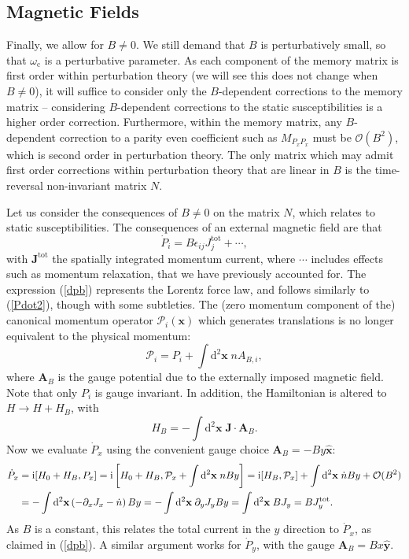 \documentclass[10pt, oneside]{book}
\begin{document}
\begin{doublespace}
\subsection{Magnetic Fields}
Finally, we allow for $B\ne 0$.   We still demand that $B$ is perturbatively small, so that $\omega_{\mathrm{c}}$ is a perturbative parameter.    As each component of the memory matrix is first order within perturbation theory (we will see this does not change when $B\ne 0$), it will suffice to consider only the $B$-dependent corrections to the memory matrix -- considering $B$-dependent corrections to the static susceptibilities is a higher order correction.       Furthermore, within the memory matrix, any $B$-dependent correction to a parity even coefficient such as $M_{P_xP_x}$ must be $\mathcal{O}(B^2)$, which is second order in perturbation theory.    The only matrix which may admit first order corrections within perturbation theory that are linear in $B$ is the time-reversal non-invariant matrix $N$.

Let us consider the consequences of $B\ne 0$ on the matrix $N$, which relates to static susceptibilities.   The consequences of an external magnetic field are that \begin{equation}
\dot{P}_i = B \epsilon_{ij}J_j^{\mathrm{tot}} + \cdots,   \label{dpb}
\end{equation}with $\mathbf{J}^{\mathrm{tot}}$ the spatially integrated momentum current, where $\cdots$ includes effects such as momentum relaxation, that we have previously accounted for.  
The expression (\ref{dpb}) represents the Lorentz force law, and follows similarly to (\ref{Pdot2}), though with some subtleties.   The (zero momentum component of the) canonical momentum operator $\mathcal{P}_i(\mathbf{x})$ which generates translations is no longer equivalent to the physical momentum:  \begin{equation}
\mathcal{P}_i = P_i + \int \mathrm{d}^2\mathbf{x} \; nA_{B,i}, 
\end{equation}where $\mathbf{A}_B$ is the gauge potential due to the externally imposed magnetic field.   Note that only $P_i$ is gauge invariant.   In addition, the Hamiltonian is altered to $H\rightarrow H+ H_B$, with \begin{equation}
H_B = - \int \mathrm{d}^2\mathbf{x}\; \mathbf{J} \cdot \mathbf{A}_B.
\end{equation}   Now we evaluate $\dot{P}_x$ using the convenient gauge choice $\mathbf{A}_B = -By \hat{\mathbf{x}}$: \begin{align}
\dot{P}_x &= \mathrm{i}[H_0+H_B, P_x ]  = \mathrm{i}\left[H_0+H_B, \mathcal{P}_x + \int \mathrm{d}^2\mathbf{x}\; nBy \right] = \mathrm{i}[H_B, \mathcal{P}_x]  +  \int \mathrm{d}^2\mathbf{x} \; \dot{n}By + \mathcal{O}(B^2) \notag \\
&= -\int \mathrm{d}^2\mathbf{x} \left( -\partial_x J_x - \dot{n}\right) By  = -\int \mathrm{d}^2\mathbf{x} \; \partial_y J_y By = \int \mathrm{d}^2\mathbf{x}\; BJ_y = BJ_y^{\mathrm{tot}}.
\end{align}
As $B$ is a constant, this relates the total current in the $y$ direction to $\dot{P}_x$, as claimed in (\ref{dpb}).   
A similar argument works for $\dot{P}_y$, with the gauge $\mathbf{A}_B = Bx\hat{\mathbf{y}}$.


\end{doublespace}
\end{document}
